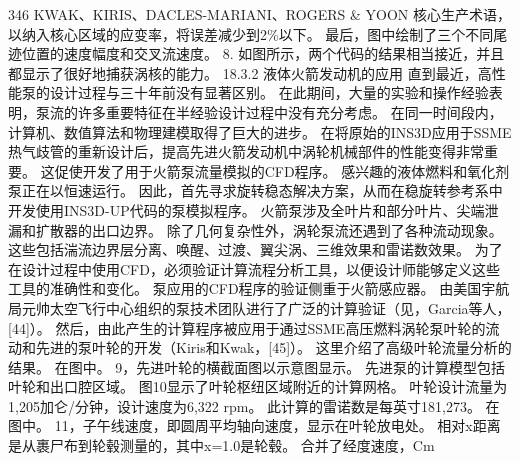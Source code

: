\documentclass[UTF8,11pt,a4paper,openany,fontset=fandol]{ctexbook}
\begin{document}
346 KWAK、KIRIS、DACLES-MARIANI、ROGERS \& YOON 核心生产术语，以纳入核心区域的应变率，将误差减少到2\%以下。 最后，图中绘制了三个不同尾迹位置的速度幅度和交叉流速度。 8. 如图所示，两个代码的结果相当接近，并且都显示了很好地捕获涡核的能力。 18.3.2 液体火箭发动机的应用 直到最近，高性能泵的设计过程与三十年前没有显著区别。 在此期间，大量的实验和操作经验表明，泵流的许多重要特征在半经验设计过程中没有充分考虑。 在同一时间段内，计算机、数值算法和物理建模取得了巨大的进步。 在将原始的INS3D应用于SSME热气歧管的重新设计后，提高先进火箭发动机中涡轮机械部件的性能变得非常重要。 这促使开发了用于火箭泵流量模拟的CFD程序。 感兴趣的液体燃料和氧化剂泵正在以恒速运行。 因此，首先寻求旋转稳态解决方案，从而在稳旋转参考系中开发使用INS3D-UP代码的泵模拟程序。 火箭泵涉及全叶片和部分叶片、尖端泄漏和扩散器的出口边界。 除了几何复杂性外，涡轮泵流还遇到了各种流动现象。 这些包括湍流边界层分离、唤醒、过渡、翼尖涡、三维效果和雷诺数效果。 为了在设计过程中使用CFD，必须验证计算流程分析工具，以便设计师能够定义这些工具的准确性和变化。 泵应用的CFD程序的验证侧重于火箭感应器。 由美国宇航局元帅太空飞行中心组织的泵技术团队进行了广泛的计算验证（见，Garcia等人，[44]）。 然后，由此产生的计算程序被应用于通过SSME高压燃料涡轮泵叶轮的流动和先进的泵叶轮的开发（Kiris和Kwak，[45]）。 这里介绍了高级叶轮流量分析的结果。 在图中。 9，先进叶轮的横截面图以示意图显示。 先进泵的计算模型包括叶轮和出口腔区域。 图10显示了叶轮枢纽区域附近的计算网格。 叶轮设计流量为1,205加仑/分钟，设计速度为6,322 rpm。 此计算的雷诺数是每英寸181,273。 在图中。 11，子午线速度，即圆周平均轴向速度，显示在叶轮放电处。 相对x距离是从裹尸布到轮毂测量的，其中x=1.0是轮毂。 合并了经度速度，Cm
\end{document}

